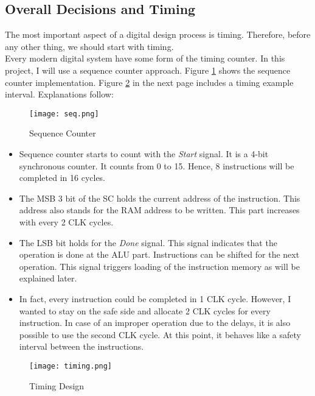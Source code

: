 \documentclass[12pt]{article}
\begin{document}
\subsection*{Overall Decisions and Timing}

The most important aspect of a digital design process is timing. Therefore, before any other thing, we should start with timing.\\

Every modern digital system have some form of the timing counter. In this project, I will use a sequence counter approach. Figure \ref{seq} shows the sequence counter implementation. Figure \ref{timing} in the next page includes a timing example interval. Explanations follow:

\begin{figure}[H]
\centering
\texttt{[image: seq.png]}
\caption{Sequence Counter}
\label{seq}
\end{figure}

\begin{itemize}
\item Sequence counter starts to count with the \textsl{Start} signal. It is a 4-bit synchronous counter. It counts from 0 to 15. Hence, 8 instructions will be completed in 16 cycles.

\item The MSB 3 bit of the SC holds the current address of the instruction. This address also stands for the RAM address to be written. This part increases with every 2 CLK cycles.

\item  The LSB bit holds for the \textsl{Done} signal. This signal indicates that the operation is done at the ALU part. Instructions can be shifted for the next operation. This signal triggers loading of the instruction memory as will be explained later.

\item In fact, every instruction could be completed in 1 CLK cycle. However, I wanted to stay on the safe side and allocate 2 CLK cycles for every instruction. In case of an improper operation due to the delays, it is also possible to use the second CLK cycle. At this point, it behaves like a safety interval between the instructions.
\end{itemize}

\begin{landscape}
\pagestyle{empty}
\begin{figure}[H]
\centering
\texttt{[image: timing.png]}
\caption{Timing Design}
\label{timing}
\end{figure}
\end{landscape}
\end{document}
